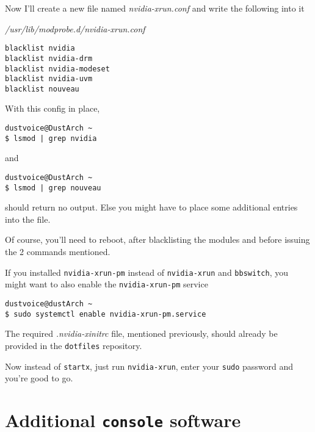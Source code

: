 \documentclass[10pt]{dustdoc}
\begin{document}
Now I’ll create a new file named \textit{nvidia-xrun.conf} and write the following into it

\begin{mintedlisting}
    \caption*{\textit{/usr/lib/modprobe.d/nvidia-xrun.conf}}
    \begin{verbatim}
blacklist nvidia
blacklist nvidia-drm
blacklist nvidia-modeset
blacklist nvidia-uvm
blacklist nouveau
    \end{verbatim}
\end{mintedlisting}

With this config in place,

\begin{verbatim}
dustvoice@DustArch ~
$ lsmod | grep nvidia
\end{verbatim}

\noindent
and

\begin{verbatim}
dustvoice@DustArch ~
$ lsmod | grep nouveau
\end{verbatim}

\noindent
should return no output.
Else you might have to place some additional entries into the file.

\begin{NOTE}
    Of course, you’ll need to reboot, after blacklisting the modules and before issuing the 2 commands mentioned.
\end{NOTE}

\begin{NOTE}
    If you installed \texttt{nvidia-xrun-pm} instead of \texttt{nvidia-xrun} and \texttt{bbswitch}, you might want to also enable the \texttt{nvidia-xrun-pm} service

    \begin{verbatim}
dustvoice@dustArch ~
$ sudo systemctl enable nvidia-xrun-pm.service
    \end{verbatim}
\end{NOTE}

\begin{NOTE}
    The required \textit{.nvidia-xinitrc} file, mentioned previously, should already be provided in the \texttt{dotfiles} repository.
\end{NOTE}

Now instead of \texttt{startx}, just run \texttt{nvidia-xrun}, enter your \texttt{sudo} password and you’re good to go.

\section{Additional \texttt{console} software}
\label{sec:additional-console-software}
\end{document}
